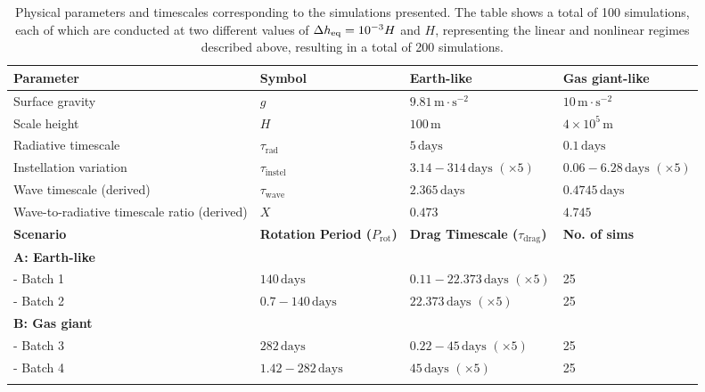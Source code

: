 \documentclass[trackchanges,twocolumn]{aastex7}
\begin{document}
\begin{table}[ht]
\centering
\caption{Physical parameters and timescales corresponding to the simulations presented. The table shows a total of 100 simulations, each of which are conducted at two different values of $\Delta h_{\rm eq} = 10^{-3} H$ and $H$, representing the linear and nonlinear regimes described above, resulting in a total of 200 simulations.}
\begin{tabular*}{\textwidth}{@{\extracolsep{\fill}}llll}
\toprule
\textbf{Parameter} & \textbf{Symbol} & \textbf{Earth-like} & \textbf{Gas giant-like} \\ 
\midrule
Surface gravity & $g$ & $9.81\,\text{m}\cdot\text{s}^{-2}$ & $10\,\text{m}\cdot\text{s}^{-2}$ \\
Scale height & $H$ & $100\,\text{m}$ & $4 \times 10^{5}\,\text{m}$ \\
Radiative timescale & $\tau_{\text{rad}}$ & $5\,\text{days}$ & $0.1\,\text{days}$ \\
Instellation variation & $\tau_{\text{instel}}$ & $3.14 - 314\,\text{days } (\times 5)$ & $0.06 - 6.28\,\text{days }  (\times 5)$ \\
Wave timescale (derived) & $\tau_{\text{wave}}$ & $2.365\,\text{days}$ & $0.4745\,\text{days}$ \\
Wave-to-radiative timescale ratio (derived) & $X$ & $0.473$ & $4.745$ \\
\addlinespace
\midrule
\textbf{Scenario} & \textbf{Rotation Period ($P_{\text{rot}}$)} & \textbf{Drag Timescale ($\tau_{\text{drag}}$)} & \textbf{No. of sims} \\ 
\midrule
\textbf{A: Earth-like} & & & \\
- Batch 1 & $140\,\text{days}$ & $0.11 - 22.373\,\text{days } (\times 5) $ & 25 \\
- Batch 2 & $0.7 - 140\,\text{days}$ & $22.373\,\text{days } (\times 5)$ & 25 \\
\addlinespace
\textbf{B: Gas giant} & & & \\
- Batch 3 & $282\,\text{days}$ & $0.22 - 45\,\text{days } (\times 5)$ & 25 \\
- Batch 4 & $1.42 - 282\,\text{days}$ & $45\,\text{days } (\times 5)$ & 25 \\
\bottomrule
\label{tab:system_params}
\end{tabular*}
\end{table}
\end{document}
